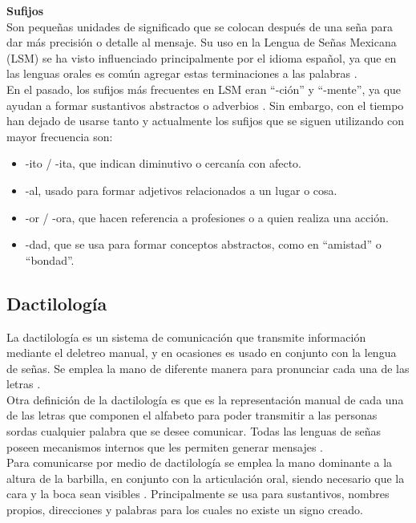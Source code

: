 \textbf{Sufijos}\\
Son pequeñas unidades de significado que se colocan después de una seña para dar más precisión o detalle al mensaje. Su uso en la Lengua de Señas Mexicana (LSM) se ha visto influenciado principalmente por el idioma español, ya que en las lenguas orales es común agregar estas terminaciones a las palabras \cite{ref37}.\\

En el pasado, los sufijos más frecuentes en LSM eran “-ción” y “-mente”, ya que ayudan a formar sustantivos abstractos o adverbios \cite{ref37}. Sin embargo, con el tiempo han dejado de usarse tanto y actualmente los sufijos que se siguen utilizando con mayor frecuencia son:

\begin{itemize}
    \item -ito / -ita, que indican diminutivo o cercanía con afecto.
    \item -al, usado para formar adjetivos relacionados a un lugar o cosa.
    \item -or / -ora, que hacen referencia a profesiones o a quien realiza una acción.
    \item -dad, que se usa para formar conceptos abstractos, como en “amistad” o “bondad”.
\end{itemize}

\newpage
\subsection{Dactilología}
La dactilología es un sistema de comunicación que transmite información mediante el deletreo manual, y en ocasiones es usado en conjunto con la lengua de señas. Se emplea la mano de diferente manera para pronunciar cada una de las letras \cite{ref30}.\\

Otra definición de la dactilología es que es la representación manual de cada una de las letras que componen el alfabeto para poder transmitir a las personas sordas cualquier palabra que se desee comunicar. Todas las lenguas de señas poseen mecanismos internos que les permiten generar mensajes \cite{ref40}.\\

Para comunicarse por medio de dactilología se emplea la mano dominante a la altura de la barbilla, en conjunto con la articulación oral, siendo necesario que la cara y la boca sean visibles \cite{ref40}. Principalmente se usa para sustantivos, nombres propios, direcciones y palabras para los cuales no existe un signo creado.\\

